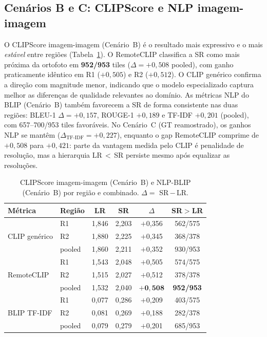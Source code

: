 \documentclass[12pt]{article}
\begin{document}
\subsection{Cenários B e C: CLIPScore e NLP imagem-imagem}

O CLIPScore imagem-imagem (Cenário~B) é o resultado mais expressivo e o
mais \emph{estável} entre regiões (Tabela~\ref{tab:clip_gt1m}). O
RemoteCLIP classifica a SR como mais próxima da ortofoto em
\textbf{952/953} tiles ($\Delta=+0{,}508$ pooled), com ganho praticamente
idêntico em R1 ($+0{,}505$) e R2 ($+0{,}512$). O CLIP genérico confirma a
direção com magnitude menor, indicando que o modelo especializado captura
melhor as diferenças de qualidade relevantes ao domínio. As métricas NLP
do BLIP (Cenário~B) também favorecem a SR de forma consistente nas duas
regiões: BLEU-1 $\Delta=+0{,}157$, ROUGE-1 $+0{,}189$ e TF-IDF $+0{,}201$
(pooled), com 657--700/953 tiles favoráveis. No Cenário~C (GT
reamostrado), os ganhos NLP se mantêm ($\Delta_{\text{TF-IDF}}=+0{,}227$),
enquanto o gap RemoteCLIP comprime de $+0{,}508$ para $+0{,}421$: parte da
vantagem medida pelo CLIP é penalidade de resolução, mas a hierarquia
LR\,$<$\,SR persiste mesmo após equalizar as resoluções.

\begin{table}[ht]
\centering
\caption{CLIPScore imagem-imagem (Cenário~B) e NLP-BLIP (Cenário~B) por
  região e combinado. $\Delta = $ SR\,$-$\,LR.}
\label{tab:clip_gt1m}
\small
\begin{tabular}{llcccc}
\toprule
\textbf{Métrica} & \textbf{Região} & \textbf{LR} & \textbf{SR} & \textbf{$\Delta$} & \textbf{SR$>$LR} \\
\midrule
\multirow{3}{*}{CLIP genérico}
  & R1     & 1{,}846 & 2{,}203 & $+$0{,}356 & 562/575 \\
  & R2     & 1{,}880 & 2{,}225 & $+$0{,}345 & 368/378 \\
  & pooled & 1{,}860 & 2{,}211 & $+$0{,}352 & 930/953 \\
\midrule
\multirow{3}{*}{RemoteCLIP}
  & R1     & 1{,}543 & 2{,}048 & $+$0{,}505 & 574/575 \\
  & R2     & 1{,}515 & 2{,}027 & $+$0{,}512 & 378/378 \\
  & pooled & 1{,}532 & 2{,}040 & $\mathbf{+0{,}508}$ & \textbf{952/953} \\
\midrule
\multirow{3}{*}{BLIP TF-IDF}
  & R1     & 0{,}077 & 0{,}286 & $+$0{,}209 & 403/575 \\
  & R2     & 0{,}081 & 0{,}269 & $+$0{,}188 & 282/378 \\
  & pooled & 0{,}079 & 0{,}279 & $+$0{,}201 & 685/953 \\
\bottomrule
\end{tabular}
\end{table}
\end{document}
